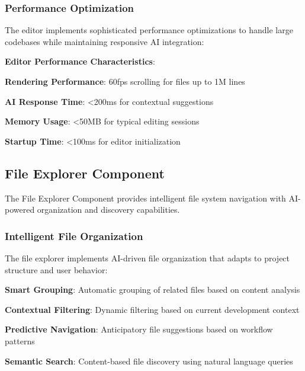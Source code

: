 \subsubsection*{Performance Optimization}

The editor implements sophisticated performance optimizations to handle large codebases while maintaining responsive AI integration:

\begin{alertbox}
\textbf{Editor Performance Characteristics}:
\begin{compactlist}
    \item \textbf{Rendering Performance}: 60fps scrolling for files up to 1M lines
    \item \textbf{AI Response Time}: <200ms for contextual suggestions
    \item \textbf{Memory Usage}: <50MB for typical editing sessions
    \item \textbf{Startup Time}: <100ms for editor initialization
\end{compactlist}
\end{alertbox}

\subsection*{File Explorer Component}

The File Explorer Component provides intelligent file system navigation with AI-powered organization and discovery capabilities.

\subsubsection*{Intelligent File Organization}

The file explorer implements AI-driven file organization that adapts to project structure and user behavior:

\begin{compactlist}
    \item \textbf{Smart Grouping}: Automatic grouping of related files based on content analysis
    \item \textbf{Contextual Filtering}: Dynamic filtering based on current development context
    \item \textbf{Predictive Navigation}: Anticipatory file suggestions based on workflow patterns
    \item \textbf{Semantic Search}: Content-based file discovery using natural language queries
\end{compactlist}


